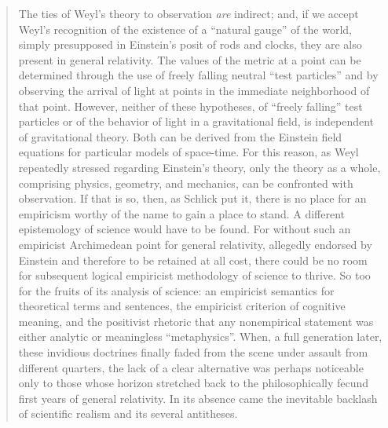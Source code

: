 \begin{quote}
    The ties of Weyl's theory to observation \emph{are} indirect; and, if we accept Weyl's recognition of the existence of a ``natural gauge'' of the world, simply presupposed in Einstein's posit of rods and clocks, they are also present in general relativity.  The values of the metric at a point can be determined through the use of freely falling neutral ``test particles'' and by observing the arrival of light at points in the immediate neighborhood of that point.  However, neither of these hypotheses, of ``freely falling'' test particles or of the behavior of light in a gravitational field, is independent of gravitational theory.  Both can be derived from the Einstein field equations for particular models of space-time.  For this reason, as Weyl repeatedly stressed regarding Einstein's theory, only the theory as a whole, comprising physics, geometry, and mechanics, can be confronted with observation.  If that is so, then, as Schlick put it, there is no place for an empiricism worthy of the name to gain a place to stand.  A different epistemology of science would have to be found.  For without such an empiricist Archimedean point for general relativity, allegedly endorsed by Einstein and therefore to be retained at all cost, there could be no room for subsequent logical empiricist methodology of science to thrive.  So too for the fruits of its analysis of science: an empiricist semantics for theoretical terms and sentences, the empiricist criterion of cognitive meaning, and the positivist rhetoric that any nonempirical statement was either analytic or meaningless ``metaphysics''.  When, a full generation later, these invidious doctrines finally faded from the scene under assault from different quarters, the lack of a clear alternative was perhaps noticeable only to those whose horizon stretched back to the philosophically fecund first years of general relativity.  In its absence came the inevitable backlash of scientific realism and its several antitheses.
    

\end{quote}
